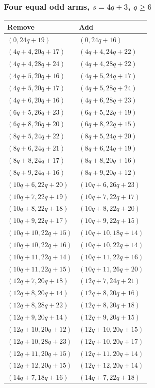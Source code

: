 \subsubsection[Four equal odd arms, s=4q+3, q >= 6]{Four equal odd arms, $s=4q+3$, $q\ge6$}
\label{templates:four-r3}
\begingroup\small
\begin{longtable}{ll}
Remove & Add\\\hline\endhead
$(0,24q+19)$ & $(0,24q+16)$\\
$(4q+4,20q+17)$ & $(4q+4,24q+22)$\\
$(4q+4,28q+24)$ & $(4q+4,28q+22)$\\
$(4q+5,20q+16)$ & $(4q+5,24q+17)$\\
$(4q+5,20q+17)$ & $(4q+5,28q+24)$\\
$(4q+6,20q+16)$ & $(4q+6,28q+23)$\\
$(6q+5,26q+23)$ & $(6q+5,22q+19)$\\
$(6q+8,26q+20)$ & $(6q+8,22q+15)$\\
$(8q+5,24q+22)$ & $(8q+5,24q+20)$\\
$(8q+6,24q+21)$ & $(8q+6,24q+19)$\\
$(8q+8,24q+17)$ & $(8q+8,20q+16)$\\
$(8q+9,24q+16)$ & $(8q+9,20q+12)$\\
$(10q+6,22q+20)$ & $(10q+6,26q+23)$\\
$(10q+7,22q+19)$ & $(10q+7,22q+17)$\\
$(10q+8,22q+18)$ & $(10q+8,22q+20)$\\
$(10q+9,22q+17)$ & $(10q+9,22q+15)$\\
$(10q+10,22q+15)$ & $(10q+10,18q+14)$\\
$(10q+10,22q+16)$ & $(10q+10,22q+14)$\\
$(10q+11,22q+14)$ & $(10q+11,22q+16)$\\
$(10q+11,22q+15)$ & $(10q+11,26q+20)$\\
$(12q+7,20q+18)$ & $(12q+7,24q+21)$\\
$(12q+8,20q+14)$ & $(12q+8,20q+16)$\\
$(12q+8,28q+22)$ & $(12q+8,20q+18)$\\
$(12q+9,20q+14)$ & $(12q+9,20q+15)$\\
$(12q+10,20q+12)$ & $(12q+10,20q+15)$\\
$(12q+10,28q+23)$ & $(12q+10,20q+17)$\\
$(12q+11,20q+15)$ & $(12q+11,20q+14)$\\
$(12q+12,20q+15)$ & $(12q+12,20q+14)$\\
$(14q+7,18q+16)$ & $(14q+7,22q+18)$\\

\end{longtable}
